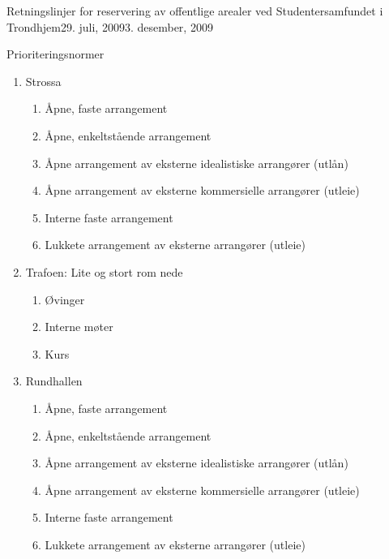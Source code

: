 \begin{instruks}{Retningslinjer for reservering av offentlige arealer
    ved Studentersamfundet i Trondhjem}{29. juli, 2009}{3. desember, 2009}
\begin{instruksledd}{Prioriteringsnormer}
\begin{enumerate}
\begin{enumerate}
\begin{enumerate}
                        \end{enumerate}
                        5 For eksempel stikkefest.
                    \item Strossa
                        \begin{enumerate}
                            \item  Åpne, faste arrangement
                            \item Åpne, enkeltstående arrangement
                            \item Åpne arrangement av eksterne idealistiske arrangører
                                (utlån)
                            \item Åpne arrangement av eksterne kommersielle arrangører
                                (utleie)
                            \item Interne faste arrangement
                            \item Lukkete arrangement av eksterne arrangører (utleie)
                        \end{enumerate}
                    \item Trafoen: Lite og stort rom nede
                        \begin{enumerate}
                            \item Øvinger
                            \item Interne møter
                            \item Kurs
                        \end{enumerate}
                    \item Rundhallen
                        \begin{enumerate}
                            \item Åpne, faste arrangement
                            \item Åpne, enkeltstående arrangement
                            \item Åpne arrangement av eksterne idealistiske arrangører (utlån)
                            \item Åpne arrangement av eksterne kommersielle arrangører (utleie)
                            \item Interne faste arrangement
                            \item Lukkete arrangement av eksterne arrangører (utleie)
                        \end{enumerate}
                \end{enumerate}
        \end{enumerate}
    \end{instruksledd}


\end{instruks}
